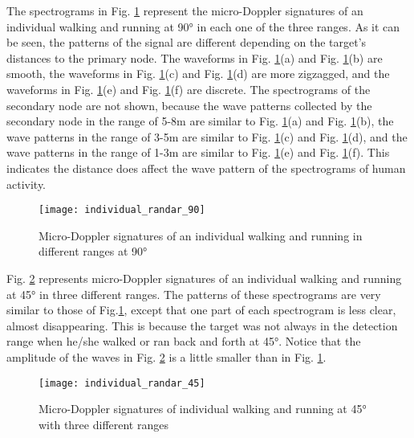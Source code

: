 The spectrograms in Fig. \ref{fig_ir9} represent the micro-Doppler signatures of an individual walking and running at \ang{90} in each one of the three ranges. As it can be seen, the patterns of the signal are different depending on the target’s distances to the primary node. The waveforms in Fig. \ref{fig_ir9}(a) and Fig. \ref{fig_ir9}(b) are smooth, the waveforms in Fig. \ref{fig_ir9}(c) and Fig. \ref{fig_ir9}(d) are more zigzagged, and the waveforms in Fig. \ref{fig_ir9}(e) and Fig. \ref{fig_ir9}(f) are discrete. The spectrograms of the secondary node are not shown, because the wave patterns collected by the secondary node in the range of 5-8m are similar to Fig. \ref{fig_ir9}(a) and Fig. \ref{fig_ir9}(b), the wave patterns in the range of 3-5m are similar to Fig. \ref{fig_ir9}(c) and Fig. \ref{fig_ir9}(d), and the wave patterns in the range of 1-3m are similar to Fig. \ref{fig_ir9}(e) and Fig. \ref{fig_ir9}(f). This indicates the distance does affect the wave pattern of the spectrograms of human activity.
\begin{figure}[!t]
\centering
\texttt{[image: individual\_randar\_90]}
\caption{Micro-Doppler signatures of an individual walking and running in different ranges at \ang{90}}
\label{fig_ir9}
\end{figure}

Fig. \ref{fig_ir4} represents micro-Doppler signatures of an individual walking and running at \ang{45} in three different ranges. The patterns of these spectrograms are very similar to those of Fig.\ref{fig_ir9}, except that one part of each spectrogram is less clear, almost disappearing. This is because the target was not always in the detection range when he/she walked or ran back and forth at \ang{45}. Notice that the amplitude of the waves in Fig. \ref{fig_ir4} is a little smaller than in Fig. \ref{fig_ir9}.

\begin{figure}[!t]
\centering
\texttt{[image: individual\_randar\_45]}
\caption{Micro-Doppler signatures of individual walking and running at \ang{45} with three different ranges}
\label{fig_ir4}
\end{figure}

